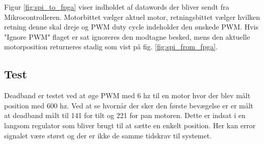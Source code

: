 

Figur \ref{fig:spi_to_fpga} viser indholdet af datawords der bliver sendt fra Mikrocontrolleren. 
Motorbittet vælger aktuel motor, retningsbittet vælger hvilken retning denne skal dreje og PWM duty cycle indeholder den ønskede PWM. 
Hvis "Ignore PWM" flaget er sat ignoreres den modtagne besked, mens den aktuelle motorposition returneres stadig som vist på fig.  \ref{fig:spi_from_fpga}. 






\subsection{Test} 

Deadband er testet ved at øge PWM med 6 hz til en motor hvor der blev målt position med 600 hz.
Ved at se hvornår der sker den første bevægelse er er målt at deadband målt til 141 for tilt og 221 for pan motoren.
Dette er indsat i en langsom regulator som bliver brugt til at sætte en enkelt position. Her kan error signalet være størst og der er ikke de samme tidskrav til systemet. 

